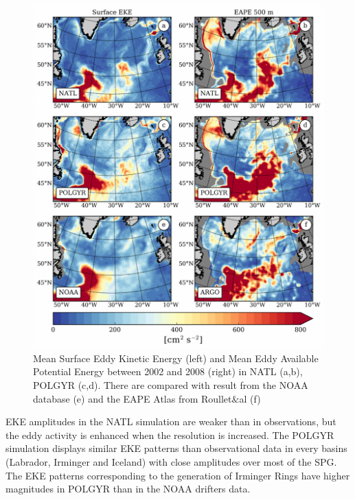 \documentclass[os, manuscript]{copernicus}
\begin{document}
\begin{figure}[t]
\includegraphics[width=15cm]{../fig_os/f05.pdf}
\caption{Mean Surface Eddy Kinetic Energy (left) and Mean Eddy Available Potential Energy between 2002 and 2008 (right) in NATL (a,b), POLGYR (c,d). There are compared with result from the NOAA database (e) and the EAPE Atlas from Roullet$\&$al (f)}
\label{f05}
\end{figure}

EKE amplitudes in the NATL simulation are weaker than in observations, but the eddy activity is enhanced when the resolution is increased. The POLGYR simulation displays similar EKE patterns than observational data in every basins (Labrador, Irminger and Iceland) with close amplitudes over most of the SPG. The EKE patterns corresponding to the generation of Irminger Rings have higher magnitudes in POLGYR than in the NOAA drifters data.
\end{document}
